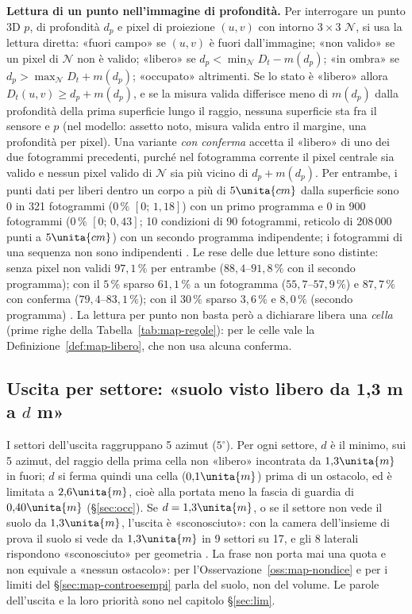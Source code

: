 \textbf{Lettura di un punto nell'immagine di profondità.} Per interrogare un punto 3D $p$, di profondità $d_p$ e pixel di proiezione $(u,v)$ con intorno $3\times3$ $\mathcal N$, si usa la lettura diretta: «fuori campo» se $(u,v)$ è fuori dall'immagine; «non valido» se un pixel di $\mathcal N$ non è valido; «libero» se $d_p<\min_{\mathcal N}D_t-m(d_p)$; «in ombra» se $d_p>\max_{\mathcal N}D_t+m(d_p)$; «occupato» altrimenti. Se lo stato è «libero» allora $D_t(u,v)\ge d_p+m(d_p)$, e se la misura valida differisce meno di $m(d_p)$ dalla profondità della prima superficie lungo il raggio, nessuna superficie sta fra il sensore e $p$  (nel modello: assetto noto, misura valida entro il margine, una profondità per pixel). Una variante \emph{con conferma} accetta il «libero» di uno dei due fotogrammi precedenti, purché nel fotogramma corrente il pixel centrale sia valido e nessun pixel valido di $\mathcal N$ sia più vicino di $d_p+m(d_p)$. Per entrambe, i punti dati per liberi dentro un corpo a più di $5\unita{cm}$ dalla superficie sono 0 in 321 fotogrammi ($0\,\%$ $[0;\,1{,}18]$) con un primo programma e 0 in 900 fotogrammi ($0\,\%$ $[0;\,0{,}43]$; 10 condizioni di 90 fotogrammi, reticolo di 208\,000 punti a $5\unita{cm}$) con un secondo programma indipendente; i fotogrammi di una sequenza non sono indipendenti . Le rese delle due letture sono distinte: senza pixel non validi $97{,}1\,\%$ per entrambe ($88{,}4$–$91{,}8\,\%$ con il secondo programma); con il $5\,\%$ sparso $61{,}1\,\%$ a un fotogramma ($55{,}7$–$57{,}9\,\%$) e $87{,}7\,\%$ con conferma ($79{,}4$–$83{,}1\,\%$); con il $30\,\%$ sparso $3{,}6\,\%$ e $8{,}0\,\%$ (secondo programma) . La lettura per punto non basta però a dichiarare libera una \emph{cella} (prime righe della Tabella~\ref{tab:map-regole}): per le celle vale la Definizione~\ref{def:map-libero}, che non usa alcuna conferma.

\subsection{Uscita per settore: «suolo visto libero da 1,3 m a $d$ m»}\label{sec:map-uscita}

I settori dell'uscita raggruppano 5 azimut ($5^\circ$). Per ogni settore, $d$ è il minimo, sui 5 azimut, del raggio della prima cella non «libero» incontrata da $1{,}3\unita{m}$ in fuori; $d$ si ferma quindi una cella ($0{,}1\unita{m}$) prima di un ostacolo, ed è limitata a $2{,}6\unita{m}$, cioè alla portata meno la fascia di guardia di $0{,}40\unita{m}$ (\S\ref{sec:occ}). Se $d=1{,}3\unita{m}$, o se il settore non vede il suolo da $1{,}3\unita{m}$, l'uscita è «sconosciuto»: con la camera dell'insieme di prova il suolo si vede da $1{,}3\unita{m}$ in 9 settori su 17, e gli 8 laterali rispondono «sconosciuto» per geometria . La frase non porta mai una quota e non equivale a «nessun ostacolo»: per l'Osservazione~\ref{oss:map-nondice} e per i limiti del \S\ref{sec:map-controesempi} parla del suolo, non del volume. Le parole dell'uscita e la loro priorità sono nel capitolo \S\ref{sec:lim}.

